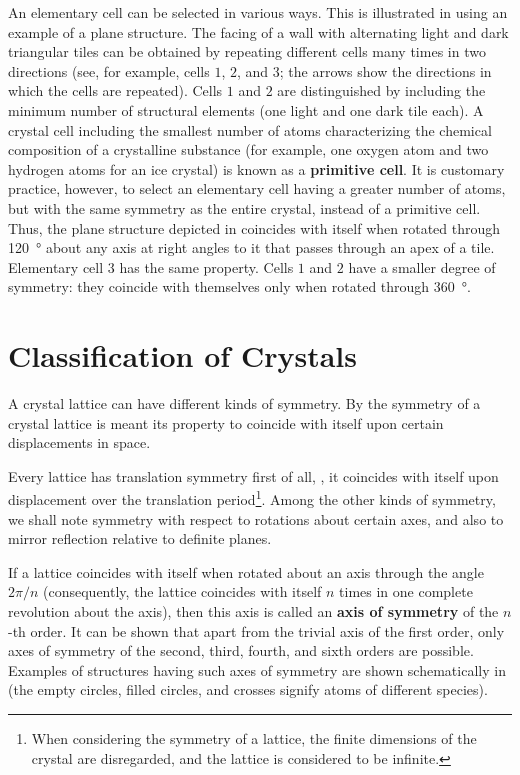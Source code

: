 An elementary cell can be selected in various ways. This is illustrated in  using an example of a plane structure. The facing of a wall with alternating light and dark triangular tiles can be obtained by repeating different cells many times in two directions (see, for example, cells $1$, $2$, and $3$; the arrows show the directions in which the cells are repeated). Cells $1$ and $2$ are distinguished by including the minimum number of structural elements (one light and one dark tile each). A crystal cell including the smallest number of atoms characterizing the chemical composition of a crystalline substance (for example, one oxygen atom and two hydrogen atoms for an ice crystal) is known as a \textbf{primitive cell}. It is customary practice, however, to select an elementary cell having a greater number of atoms, but with the same symmetry as the entire crystal, instead of a primitive cell. Thus, the plane structure depicted in  coincides with itself when rotated through \SI{120}{\degree} about any axis at right angles to it that passes through an apex of a tile. Elementary cell $3$ has the same property. Cells $1$ and $2$ have a smaller degree of symmetry: they coincide with themselves only when rotated through \SI{360}{\degree}.

\section{Classification of Crystals}\label{sec:13_2}

A crystal lattice can have different kinds of symmetry. By the symmetry of a crystal lattice is meant its property to coincide with itself upon certain displacements in space.

Every lattice has translation symmetry first of all, \ie, it coincides with itself upon displacement over the translation period\footnote{When considering the symmetry of a lattice, the finite dimensions of the crystal are disregarded, and the lattice is considered to be infinite.}. Among the other kinds of symmetry, we shall note symmetry with respect to rotations about certain axes, and also to mirror reflection relative to definite planes.

If a lattice coincides with itself when rotated about an axis through the angle $2\pi/n$ (consequently, the lattice coincides with itself $n$ times in one complete revolution about the axis), then this axis is called an \textbf{axis of symmetry} of the $n$-th order. It can be shown that apart from the trivial axis of the first order, only axes of symmetry of the second, third, fourth, and sixth orders are possible. Examples of structures having such axes of symmetry are shown schematically in  (the empty circles, filled circles, and crosses signify atoms of different species).

